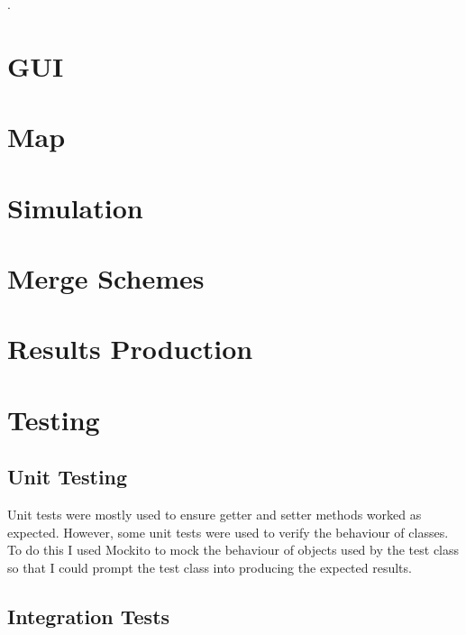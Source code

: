 .

\section{GUI}
\label{sec:GUI}

\section{Map}
\label{sec:Map}

\section{Simulation}
\label{sec:Simulation}

\section{Merge Schemes}
\label{sec:Merge Schemes}

\section{Results Production}
\label{sec:Results Production}

\section{Testing}
\label{sec:Testing}

\subsection{Unit Testing}
\label{subsec:Unit Testing}
Unit tests were mostly used to ensure getter and setter methods worked as expected. However, some unit tests were used to verify the behaviour of classes. To do this I used Mockito \citep{MockitoWebsite} to mock the behaviour of objects used by the test class so that I could prompt the test class into producing the expected results.

\subsection{Integration Tests}
\label{subsec:Integration Tests}


